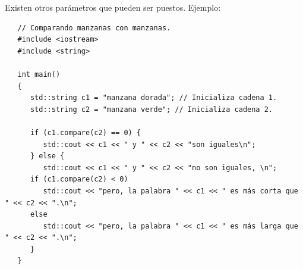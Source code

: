 Existen otros parámetros que pueden ser puestos. Ejemplo:
\begin{lstlisting}
   // Comparando manzanas con manzanas.
   #include <iostream>
   #include <string>

   int main()
   {
      std::string c1 = "manzana dorada"; // Inicializa cadena 1.
      std::string c2 = "manzana verde"; // Inicializa cadena 2.

      if (c1.compare(c2) == 0) {
         std::cout << c1 << " y " << c2 << "son iguales\n";
      } else {
         std::cout << c1 << " y " << c2 << "no son iguales, \n";
      if (c1.compare(c2) < 0)
         std::cout << "pero, la palabra " << c1 << " es más corta que " << c2 << ".\n";
      else
         std::cout << "pero, la palabra " << c1 << " es más larga que " << c2 << ".\n";
      }
   }
\end{lstlisting}